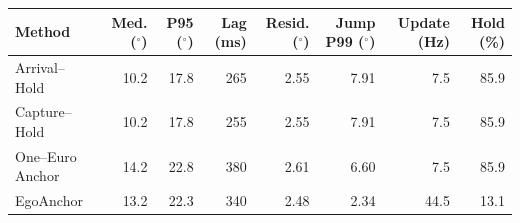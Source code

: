 \begin{tabular}{lrrrrrrr}
\toprule
Method & Med. ($^\circ$) & P95 ($^\circ$) & Lag (ms) & Resid. ($^\circ$) & Jump P99 ($^\circ$) & Update (Hz) & Hold (\%) \\
\midrule
Arrival--Hold & 10.2 & 17.8 & 265 & 2.55 & 7.91 & 7.5 & 85.9 \\
Capture--Hold & 10.2 & 17.8 & 255 & 2.55 & 7.91 & 7.5 & 85.9 \\
One--Euro Anchor & 14.2 & 22.8 & 380 & 2.61 & 6.60 & 7.5 & 85.9 \\
EgoAnchor & 13.2 & 22.3 & 340 & 2.48 & 2.34 & 44.5 & 13.1 \\
\bottomrule
\end{tabular}

